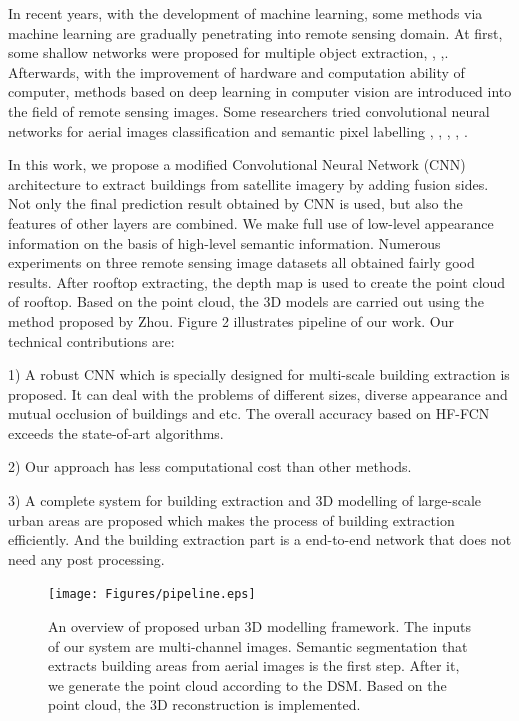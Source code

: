 In recent years, with the development of machine learning, some methods via machine learning are gradually penetrating into remote sensing domain. At first, some shallow networks were proposed for multiple object extraction\cite{IEEEexample:mnih2013machine}, \cite{IEEEexample:saito2016multiple}, \cite{IEEEexample:alshehhi2017simultaneous},\cite{IEEEexample:zhao2017contextually}. Afterwards, with the improvement of hardware and computation ability of computer, methods based on deep learning in computer vision are introduced into the field of remote sensing images. Some researchers tried convolutional neural networks for aerial images classification and semantic pixel labelling \cite{IEEEexample:paisitkriangkrai2015effective}, \cite{IEEEexample:liu2017dense}, \cite{IEEEexample:audebert2017deep}, \cite{IEEEexample:kampffmeyer2017urban}, \cite{IEEEexample:he2017multi}.\par
In this work, we propose a modified Convolutional Neural Network (CNN) architecture to extract buildings from satellite imagery by adding fusion sides. Not only the final prediction result obtained by CNN is used, but also the features of other layers are combined. We make full use of low-level appearance information on the basis of high-level semantic information. Numerous experiments on three remote sensing image datasets all obtained fairly good results. After rooftop extracting, the depth map is used to create the point cloud of rooftop. Based on the point cloud, the 3D models are carried out using the method proposed by Zhou\cite{IEEEexample:zhou20112}. Figure 2 illustrates pipeline of our work. Our technical contributions are:\par
 1) A robust CNN which is specially designed for multi-scale building extraction is proposed. It can deal with the problems of different sizes, diverse appearance and mutual occlusion of buildings and etc. The overall accuracy based on HF-FCN exceeds the state-of-art algorithms.\par
 2) Our approach has less computational cost than other methods.\par
 3) A complete system for building extraction and 3D modelling of large-scale urban areas are proposed which makes the process of building extraction efficiently. And the building extraction part is a end-to-end network that does not need any post processing.
\begin{center}
\begin{figure}
\texttt{[image: Figures/pipeline.eps]}
\caption{An overview of proposed urban 3D modelling framework. The inputs of our system are multi-channel images. Semantic segmentation that extracts building areas from aerial images is the first step. After it, we generate the point cloud according to the DSM. Based on the point cloud, the 3D reconstruction is implemented.}
\label{2}
\end{figure}
\end{center}
